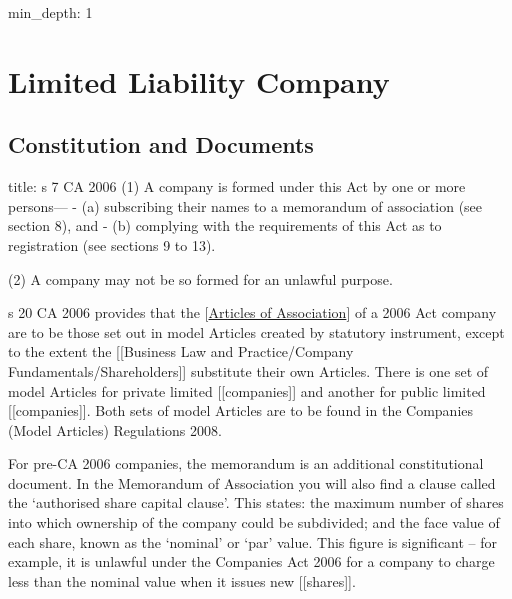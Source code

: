 \documentclass[
]{article}
\author{}
\date{}
\newenvironment{Shaded}{}{}
\newcommand{\NormalTok}[1]{#1}
\begin{document}
{
\setcounter{tocdepth}{3}
\tableofcontents
}
\begin{Shaded}
\begin{Highlighting}[]
\NormalTok{min\_depth: 1}
\end{Highlighting}
\end{Shaded}

\hypertarget{limited-liability-company}{%
\section{Limited Liability Company}\label{limited-liability-company}}

\hypertarget{constitution-and-documents}{%
\subsection{Constitution and
Documents}\label{constitution-and-documents}}

\begin{Shaded}
\begin{Highlighting}[]
\NormalTok{title: s 7 CA 2006}
\NormalTok{(1) A company is formed under this Act by one or more persons—}
\NormalTok{{-} (a) subscribing their names to a memorandum of association (see section 8), and}
\NormalTok{{-} (b) complying with the requirements of this Act as to registration (see sections 9 to 13).}

\NormalTok{(2) A company may not be so formed for an unlawful purpose.}
\end{Highlighting}
\end{Shaded}

s 20 CA 2006 provides that the
{[}\protect\hyperlink{articles-of-association-1}{Articles of
Association}{]} of a 2006 Act company are to be those set out in model
Articles created by statutory instrument, except to the extent the
{[}{[}Business Law and Practice/Company Fundamentals/Shareholders{]}{]}
substitute their own Articles. There is one set of model Articles for
private limited {[}{[}companies{]}{]} and another for public limited
{[}{[}companies{]}{]}. Both sets of model Articles are to be found in
the Companies (Model Articles) Regulations 2008.

For pre-CA 2006 companies, the memorandum is an additional
constitutional document. In the Memorandum of Association you will also
find a clause called the `authorised share capital clause'. This states:
the maximum number of shares into which ownership of the company could
be subdivided; and the face value of each share, known as the `nominal'
or `par' value. This figure is significant -- for example, it is
unlawful under the Companies Act 2006 for a company to charge less than
the nominal value when it issues new {[}{[}shares{]}{]}.
\end{document}
